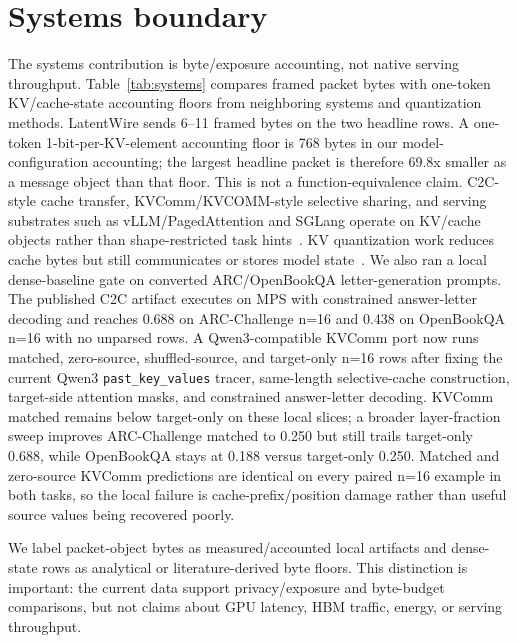 \documentclass{article}
\newcommand{\method}{LatentWire}
\newcommand{\arc}{ARC-Challenge}
\newcommand{\obqa}{OpenBookQA}
\begin{document}
\section{Systems boundary}

The systems contribution is byte/exposure accounting, not native serving throughput. Table~\ref{tab:systems} compares framed packet bytes with one-token KV/cache-state accounting floors from neighboring systems and quantization methods. \method{} sends 6--11 framed bytes on the two headline rows. A one-token 1-bit-per-KV-element accounting floor is 768 bytes in our model-configuration accounting; the largest headline packet is therefore 69.8x smaller as a message object than that floor. This is not a function-equivalence claim. C2C-style cache transfer, KVComm/KVCOMM-style selective sharing, and serving substrates such as vLLM/PagedAttention and SGLang operate on KV/cache objects rather than shape-restricted task hints~\citep{Fu2025C2C,Shi2025KVComm,Ye2025KVCOMM,Kwon2023vLLM,Zheng2023SGLang}. KV quantization work reduces cache bytes but still communicates or stores model state~\citep{Zandieh2024QJL,Liu2024KIVI,Hooper2024KVQuant,Zandieh2025TurboQuant}. We also ran a local dense-baseline gate on converted ARC/OpenBookQA letter-generation prompts. The published C2C artifact executes on MPS with constrained answer-letter decoding and reaches 0.688 on \arc{} n=16 and 0.438 on \obqa{} n=16 with no unparsed rows. A Qwen3-compatible KVComm port now runs matched, zero-source, shuffled-source, and target-only n=16 rows after fixing the current Qwen3 \texttt{past\_key\_values} tracer, same-length selective-cache construction, target-side attention masks, and constrained answer-letter decoding. KVComm matched remains below target-only on these local slices; a broader layer-fraction sweep improves \arc{} matched to 0.250 but still trails target-only 0.688, while \obqa{} stays at 0.188 versus target-only 0.250. Matched and zero-source KVComm predictions are identical on every paired n=16 example in both tasks, so the local failure is cache-prefix/position damage rather than useful source values being recovered poorly.

We label packet-object bytes as measured/accounted local artifacts and dense-state rows as analytical or literature-derived byte floors. This distinction is important: the current data support privacy/exposure and byte-budget comparisons, but not claims about GPU latency, HBM traffic, energy, or serving throughput.
\end{document}

